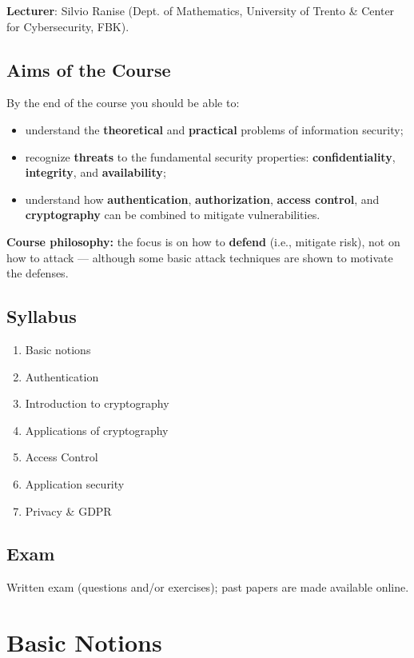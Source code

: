 \documentclass[12pt, a4paper]{article}
\begin{document}
\textbf{Lecturer}: Silvio Ranise (Dept. of Mathematics, University of Trento \& Center for Cybersecurity, FBK).

\subsection*{Aims of the Course}
By the end of the course you should be able to:
\begin{itemize}
    \item understand the \textbf{theoretical} and \textbf{practical} problems of information security;
    \item recognize \textbf{threats} to the fundamental security properties: \textbf{confidentiality}, \textbf{integrity}, and \textbf{availability};
    \item understand how \textbf{authentication}, \textbf{authorization}, \textbf{access control}, and \textbf{cryptography} can be combined to mitigate vulnerabilities.
\end{itemize}

\textcolor{blue!50!black}{\textbf{Course philosophy:}} the focus is on how to \textbf{defend} (i.e., mitigate risk), not on how to attack — although some basic attack techniques are shown to motivate the defenses.

\subsection*{Syllabus}
\begin{enumerate}
    \item Basic notions
    \item Authentication
    \item Introduction to cryptography
    \item Applications of cryptography
    \item Access Control
    \item Application security
    \item Privacy \& GDPR
\end{enumerate}

\subsection*{Exam}
Written exam (questions and/or exercises); past papers are made available online.

\section{Basic Notions}
\end{document}
